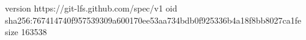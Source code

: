 version https://git-lfs.github.com/spec/v1
oid sha256:767414740f957539309a600170ee53aa734bdb0f925336b4a18f8bb8027ca1fe
size 163538
